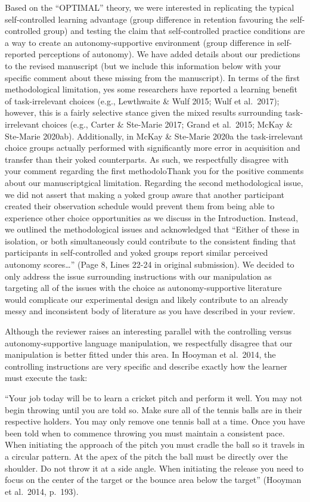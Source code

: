 \documentclass[final]{article}
\begin{document}
Based on the ``OPTIMAL'' theory, we were interested in replicating the typical self-controlled learning advantage (group difference in retention favouring the self-controlled group) and testing the claim that self-controlled practice conditions are a way to create an autonomy-supportive environment (group difference in self-reported perceptions of autonomy). We have added details about our predictions to the revised manuscript (but we include this information below with your specific comment about these missing from the manuscript). In terms of the first methodological limitation, yes some researchers have reported a learning benefit of task-irrelevant choices (e.g., Lewthwaite \& Wulf 2015; Wulf et al.~2017); however, this is a fairly selective stance given the mixed results surrounding task-irrelevant choices (e.g., Carter \& Ste-Marie 2017; Grand et al.~2015; McKay \& Ste-Marie 2020ab). Additionally, in McKay \& Ste-Marie 2020a the task-irrelevant choice groups actually performed with significantly more error in acquisition and transfer than their yoked counterparts. As such, we respectfully disagree with your comment regarding the first methodoloThank you for the positive comments about our manuscriptgical limitation. Regarding the second methodological issue, we did not assert that making a yoked group aware that another participant created their observation schedule would prevent them from being able to experience other choice opportunities as we discuss in the Introduction. Instead, we outlined the methodological issues and acknowledged that ``Either of these in isolation, or both simultaneously could contribute to the consistent finding that participants in self-controlled and yoked groups report similar perceived autonomy scores\ldots{}'' (Page 8, Lines 22-24 in original submission). We decided to only address the issue surrounding instructions with our manipulation as targeting all of the issues with the choice as autonomy-supportive literature would complicate our experimental design and likely contribute to an already messy and inconsistent body of literature as you have described in your review.

Although the reviewer raises an interesting parallel with the controlling versus autonomy-supportive language manipulation, we respectfully disagree that our manipulation is better fitted under this area. In Hooyman et al.~2014, the controlling instructions are very specific and describe exactly how the learner must execute the task:

``Your job today will be to learn a cricket pitch and perform it well. You may not begin throwing until you are told so. Make sure all of the tennis balls are in their respective holders. You may only remove one tennis ball at a time. Once you have been told when to commence throwing you must maintain a consistent pace. When initiating the approach of the pitch you must cradle the ball so it travels in a circular pattern. At the apex of the pitch the ball must be directly over the shoulder. Do not throw it at a side angle. When initiating the release you need to focus on the center of the target or the bounce area below the target'' (Hooyman et al.~2014, p.~193).
\end{document}
